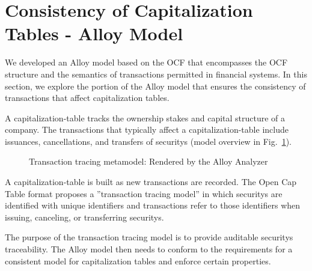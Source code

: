 \section{Consistency of Capitalization Tables - Alloy Model}
\label{ch:transaction-tracing}
\label{sec:transaction-tracing}

We developed an Alloy model based on the OCF that encompasses the OCF structure and the semantics of transactions permitted in financial systems.
In this section, we explore the portion of the Alloy model that ensures the consistency of \glspl{transaction} that affect capitalization tables. 

A \gls{capitalization-table} tracks the ownership stakes and capital structure of a company. The \glspl{transaction} that typically affect a \gls{capitalization-table} include \glspl{issuance}, cancellations, and transfers of  \glspl{security} 
%
(model overview in Fig.~\ref{fig:metamodel}).

\begin{figure}[!h]
	\centering
	\caption{Transaction tracing metamodel: 
	Rendered by the Alloy Analyzer \label{fig:metamodel}}
\end{figure}


A \gls{capitalization-table} is built as new \glspl{transaction} are recorded. The Open Cap Table format proposes a ''transaction tracing model'' in which \glspl{security} are identified with unique identifiers and \glspl{transaction} refer to those identifiers when issuing, canceling, or transferring \glspl{security}.

The purpose of the transaction tracing model is to provide auditable \glspl{security} traceability. The Alloy model then needs to conform to the requirements for a consistent model for capitalization tables and enforce certain properties.

